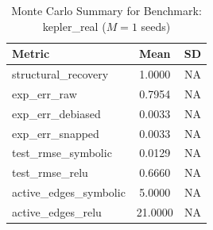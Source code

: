 \begin{table}[ht]
\centering
\caption{Monte Carlo Summary for Benchmark: kepler_real ($M = 1$ seeds)}
\begin{tabular}{lcc}
\hline
Metric & Mean & SD \\
\hline
structural\_recovery & 1.0000 & NA \\
exp\_err\_raw & 0.7954 & NA \\
exp\_err\_debiased & 0.0033 & NA \\
exp\_err\_snapped & 0.0033 & NA \\
test\_rmse\_symbolic & 0.0129 & NA \\
test\_rmse\_relu & 0.6660 & NA \\
active\_edges\_symbolic & 5.0000 & NA \\
active\_edges\_relu & 21.0000 & NA \\
\hline
\end{tabular}
\end{table}
